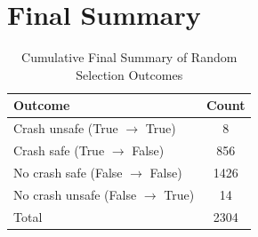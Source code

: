 \documentclass{article}
\begin{document}
\section{Final Summary}

\begin{table}[h]
\centering
\caption{Cumulative Final Summary of Random Selection Outcomes}
\begin{tabular}{lc}
\toprule
Outcome & Count \\
\midrule
Crash unsafe (True $\rightarrow$ True) & 8 \\ 
Crash safe (True $\rightarrow$ False) & 856 \\ 
No crash safe (False $\rightarrow$ False) & 1426 \\ 
No crash unsafe (False $\rightarrow$ True) & 14 \\ 
\midrule
Total & 2304 \\ 
\bottomrule
\end{tabular}
\end{table}
\end{document}
